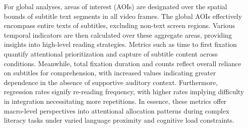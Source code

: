 For global analyses, areas of interest (AOIs) are designated over the
spatial bounds of subtitle text segments in all video frames. The global
AOIs effectively encompass entire texts of subtitles, excluding non-text
screen regions. Various temporal indicators are then calculated over
these aggregate areas, providing insights into high-level reading
strategies. Metrics such as time to first fixation quantify attentional
prioritization and capture of subtitle content across conditions.
Meanwhile, total fixation duration and counts reflect overall reliance
on subtitles for comprehension, with increased values indicating greater
dependence in the absence of supportive auditory context. Furthermore,
regression rates signify re-reading frequency, with higher rates
implying difficulty in integration necessitating more repetitions. In
essence, these metrics offer macro-level perspectives into attentional
allocation patterns during complex literacy tasks under varied language
proximity and cognitive load constraints.

